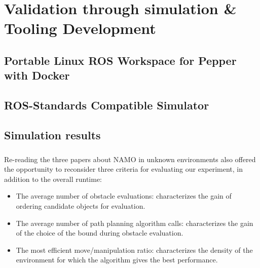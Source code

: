
\chapter{Validation through simulation \& Tooling Development} %

\label{Chapter5} %

\section{Portable Linux ROS Workspace for Pepper with Docker}

\section{ROS-Standards Compatible Simulator}

\section{Simulation results}

\paragraph{} Re-reading the three papers about NAMO in unknown environments also offered the opportunity to reconsider three criteria for evaluating our experiment, in addition to the overall runtime:

\begin{itemize}
  \item The average number of obstacle evaluations: characterizes the gain of ordering candidate objects for evaluation.
  \item The average number of path planning algorithm calls: characterizes the gain of the choice of the bound during obstacle evaluation.
  \item The most efficient move/manipulation ratio: characterizes the density of the environment for which the algorithm gives the best performance.
\end{itemize}
